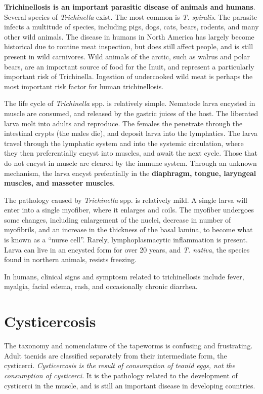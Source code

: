 \documentclass[openany]{book}
\begin{document}
\textbf{Trichinellosis is an important parasitic disease of animals and
humans}. Several species of \emph{Trichinella} exist. The most common is
\emph{T. spiralis}. The parasite infects a multitude of species,
including pigs, dogs, cats, bears, rodents, and many other wild animals.
The disease in humans in North America has largely become historical due
to routine meat inspection, but does still affect people, and is still
present in wild carnivores. Wild animals of the arctic, such as walrus
and polar bears, are an important source of food for the Inuit, and
represent a particularly important risk of Trichinella. Ingestion of
undercooked wild meat is perhaps the most important risk factor for
human trichinellosis.

The life cycle of \emph{Trichinella} spp. is relatively simple. Nematode
larva encysted in muscle are consumed, and released by the gastric
juices of the host. The liberated larva molt into adults and reproduce.
The females the penetrate through the intestinal crypts (the males die),
and deposit larva into the lymphatics. The larva travel through the
lymphatic system and into the systemic circulation, where they then
preferentially encyst into muscles, and await the next cycle. Those that
do not encyst in muscle are cleared by the immune system. Through an
unknown mechanism, the larva encyst prefentially in the
\textbf{diaphragm, tongue, laryngeal muscles, and masseter muscles}.

The pathology caused by \emph{Trichinella} spp. is relatively mild. A
single larva will enter into a single myofiber, where it enlarges and
coils. The myofiber undergoes some changes, including enlargement of the
nuclei, decrease in number of myofibrils, and an increase in the
thickness of the basal lamina, to become what is known as a ``nurse
cell''. Rarely, lymphoplasmacytic inflammation is present. Larva can
live in an encysted form for over 20 years, and \emph{T. nativa}, the
species found in northern animals, resists freezing.

In humans, clinical signs and symptosm related to trichinellosis include
fever, myalgia, facial edema, rash, and occasionally chronic diarrhea.

\section{Cysticercosis}\label{cysticercosis}

The taxonomy and nomenclature of the tapeworms is confusing and
frustrating. Adult taenids are classified separately from their
intermediate form, the cysticerci. \emph{Cysticercosis is the result of
consumption of teanid eggs, not the consumption of cysticerci.} It is
the pathology related to the development of cysticerci in the muscle,
and is still an important disease in developing countries.
\end{document}
